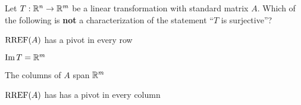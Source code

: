 \begin{readinessAssuranceTest}
\item Let $T: \mathbb{R}^n \rightarrow \mathbb{R}^m$ be a linear transformation with standard matrix $A$.  Which of the following is {\bf not} a characterization of the statement ``$T$ is surjective''?
\begin{readinessAssuranceTestChoices}
\item $\operatorname{RREF}(A)$ has a pivot in every row
\item $\operatorname{Im} T = \mathbb{R}^m$
\item The columns of $A$ span $\mathbb{R}^m$
\item $\operatorname{RREF}(A)$ has has a pivot in every column %
\end{readinessAssuranceTestChoices}


\end{readinessAssuranceTest}
